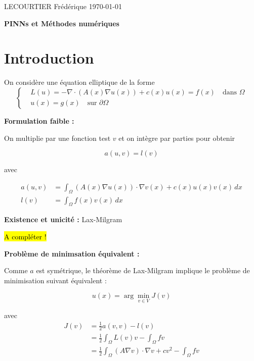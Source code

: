 \documentclass[french]{article}
\begin{document}
	LECOURTIER Frédérique \hfill \today
	\begin{center}
		\Large\textbf{{PINNs et Méthodes numériques}}
	\end{center}

	\section{Introduction}

    On considère une équation elliptique de la forme
    \begin{equation}
		\left\{\begin{aligned}
			&L(u)=-\nabla \cdot (A(x) \nabla u(x)) + c(x)u(x) = f(x) \quad \text{dans } \Omega \\
			&u(x) = g(x) \quad \text{sur } \partial \Omega
		\end{aligned}\right. \label{edp}
	\end{equation}

	\textbf{Formulation faible :} 
	
	On multiplie par une fonction test $v$ et on intègre par parties pour obtenir

	\begin{equation}
		a(u,v)=l(v)
	\end{equation}

	avec

	\begin{align*}
		a(u,v)&=\int_{\Omega} (A(x)\nabla u(x)) \cdot \nabla v(x) + c(x)u(x)v(x) \, dx \\
		l(v)&=\int_{\Omega} f(x)v(x) \, dx
	\end{align*}


	\textbf{Existence et unicité :} Lax-Milgram

	\hl{A compléter !}

	\textbf{Problème de minimsation équivalent :} 
	
	Comme $a$ est symétrique, le théorème de Lax-Milgram implique le problème de minimisation suivant équivalent :

	\begin{equation}
		u(x)=\arg\min_{v \in V}J(v) \label{min}
	\end{equation}

	avec
	\begin{align*}
		J(v)&=\frac{1}{2}a(v,v) - l(v) \\
		&=\frac{1}{2} \int_{\Omega} L(v) v - \int_{\Omega} fv \\
		&=\frac{1}{2} \int_{\Omega} (A\nabla v) \cdot \nabla v + cv^2 - \int_{\Omega} fv
	\end{align*}
\end{document}
